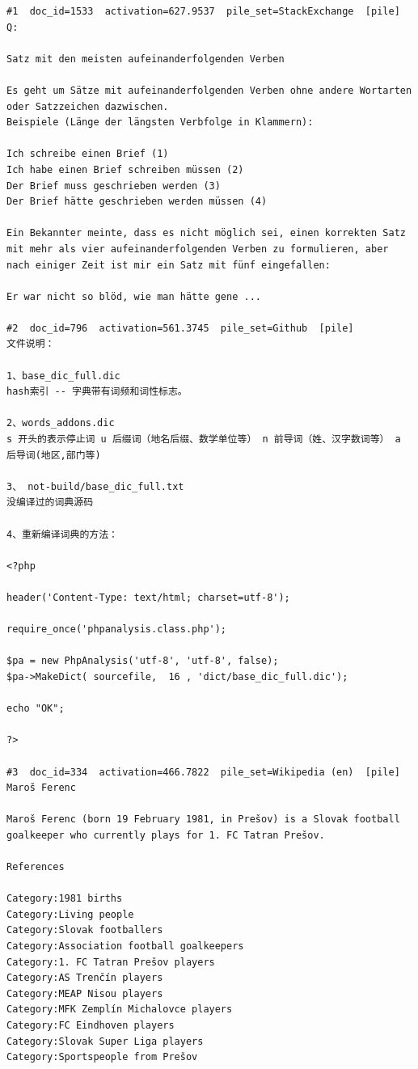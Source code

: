 \begin{verbatim}
#1  doc_id=1533  activation=627.9537  pile_set=StackExchange  [pile]
Q:

Satz mit den meisten aufeinanderfolgenden Verben

Es geht um Sätze mit aufeinanderfolgenden Verben ohne andere Wortarten oder Satzzeichen dazwischen.
Beispiele (Länge der längsten Verbfolge in Klammern):

Ich schreibe einen Brief (1)
Ich habe einen Brief schreiben müssen (2)
Der Brief muss geschrieben werden (3)
Der Brief hätte geschrieben werden müssen (4)

Ein Bekannter meinte, dass es nicht möglich sei, einen korrekten Satz mit mehr als vier aufeinanderfolgenden Verben zu formulieren, aber nach einiger Zeit ist mir ein Satz mit fünf eingefallen:

Er war nicht so blöd, wie man hätte gene ...

#2  doc_id=796  activation=561.3745  pile_set=Github  [pile]
﻿文件说明：

1、base_dic_full.dic
hash索引 -- 字典带有词频和词性标志。

2、words_addons.dic
s 开头的表示停止词 u 后缀词（地名后缀、数学单位等） n 前导词（姓、汉字数词等） a 后导词(地区,部门等)

3、 not-build/base_dic_full.txt
没编译过的词典源码

4、重新编译词典的方法：

<?php

header('Content-Type: text/html; charset=utf-8');

require_once('phpanalysis.class.php');

$pa = new PhpAnalysis('utf-8', 'utf-8', false);
$pa->MakeDict( sourcefile,  16 , 'dict/base_dic_full.dic');

echo "OK";

?>

#3  doc_id=334  activation=466.7822  pile_set=Wikipedia (en)  [pile]
Maroš Ferenc

Maroš Ferenc (born 19 February 1981, in Prešov) is a Slovak football goalkeeper who currently plays for 1. FC Tatran Prešov.

References

Category:1981 births
Category:Living people
Category:Slovak footballers
Category:Association football goalkeepers
Category:1. FC Tatran Prešov players
Category:AS Trenčín players
Category:MEAP Nisou players
Category:MFK Zemplín Michalovce players
Category:FC Eindhoven players
Category:Slovak Super Liga players
Category:Sportspeople from Prešov


\end{verbatim}
